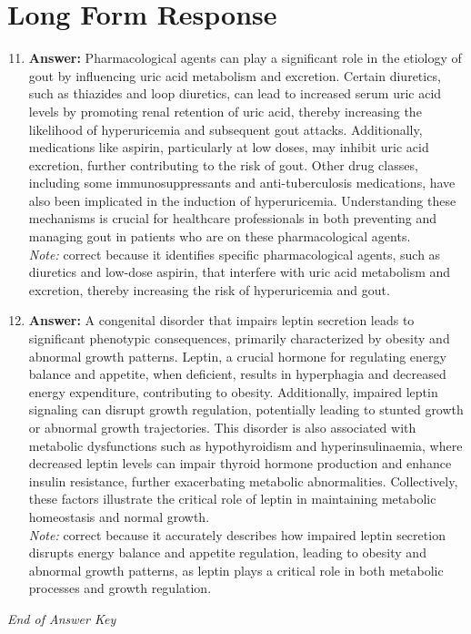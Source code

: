 \documentclass[12pt]{article}
\begin{document}
\section*{Long Form Response}
\begin{enumerate}[label=\arabic*.]
\setcounter{enumi}{10}
\item \textbf{Answer:} Pharmacological agents can play a significant role in the etiology of gout by influencing uric acid metabolism and excretion. Certain diuretics, such as thiazides and loop diuretics, can lead to increased serum uric acid levels by promoting renal retention of uric acid, thereby increasing the likelihood of hyperuricemia and subsequent gout attacks. Additionally, medications like aspirin, particularly at low doses, may inhibit uric acid excretion, further contributing to the risk of gout. Other drug classes, including some immunosuppressants and anti-tuberculosis medications, have also been implicated in the induction of hyperuricemia. Understanding these mechanisms is crucial for healthcare professionals in both preventing and managing gout in patients who are on these pharmacological agents.
\\ \textit{Note:} correct because it identifies specific pharmacological agents, such as diuretics and low-dose aspirin, that interfere with uric acid metabolism and excretion, thereby increasing the risk of hyperuricemia and gout.
\item \textbf{Answer:} A congenital disorder that impairs leptin secretion leads to significant phenotypic consequences, primarily characterized by obesity and abnormal growth patterns. Leptin, a crucial hormone for regulating energy balance and appetite, when deficient, results in hyperphagia and decreased energy expenditure, contributing to obesity. Additionally, impaired leptin signaling can disrupt growth regulation, potentially leading to stunted growth or abnormal growth trajectories. This disorder is also associated with metabolic dysfunctions such as hypothyroidism and hyperinsulinaemia, where decreased leptin levels can impair thyroid hormone production and enhance insulin resistance, further exacerbating metabolic abnormalities. Collectively, these factors illustrate the critical role of leptin in maintaining metabolic homeostasis and normal growth.
\\ \textit{Note:} correct because it accurately describes how impaired leptin secretion disrupts energy balance and appetite regulation, leading to obesity and abnormal growth patterns, as leptin plays a critical role in both metabolic processes and growth regulation.
\end{enumerate}

\vfill
\noindent\textit{End of Answer Key}
\end{document}
